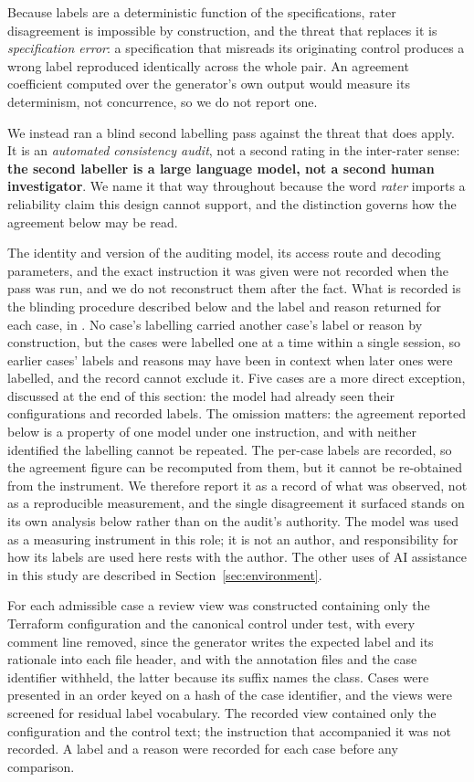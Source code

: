 \documentclass[smallextended]{svjour3}
\begin{document}
Because labels are a deterministic function of the specifications, rater
disagreement is impossible by construction, and the threat that replaces it is
\emph{specification error}: a specification that misreads its originating control
produces a wrong label reproduced identically across the whole pair. An agreement
coefficient computed over the generator's own output would measure its
determinism, not concurrence, so we do not report one.

We instead ran a blind second labelling pass against the threat that does apply.
It is an \emph{automated consistency audit}, not a second rating in the
inter-rater sense: \textbf{the second labeller is a large language model, not a
second human investigator}. We name it that way throughout because the word
\emph{rater} imports a reliability claim this design cannot support, and the
distinction governs how the agreement below may be read.

The identity and version of the auditing model, its access route and decoding
parameters, and the exact instruction it was given were not recorded when the
pass was run, and we do not reconstruct them after the fact. What is recorded is
the blinding procedure described below and the label and reason returned for
each case, in . No case's
labelling carried another case's label or reason by construction, but the cases
were labelled one at a time within a single session, so earlier cases' labels and
reasons may have been in context when later ones were labelled, and the record
cannot exclude it. Five cases are a more direct exception, discussed at the end
of this section: the model had already seen their configurations and recorded
labels. The omission matters: the agreement reported below is a
property of one model under one instruction, and with neither identified the
labelling cannot be repeated. The per-case labels are recorded, so the agreement
figure can be recomputed from them, but it cannot be re-obtained from the
instrument. We therefore report
it as a record of what was observed, not as a reproducible measurement, and the
single disagreement it surfaced stands on its own analysis below rather than on
the audit's authority. The model was used as a measuring
instrument in this role; it is not an author, and responsibility for how its
labels are used here rests with the author. The other uses of AI assistance in
this study are described in Section~\ref{sec:environment}.

For each admissible case a review view was constructed containing only the
Terraform configuration and the canonical control under test, with every comment
line removed, since the generator writes the expected label and its rationale
into each file header, and with the annotation files and the case identifier
withheld, the latter because its suffix names the class. Cases were presented in
an order keyed on a hash of the case identifier, and the views were screened for
residual label vocabulary. The recorded view contained only the configuration and
the control text; the instruction that accompanied it was not recorded. A label
and a reason were recorded for each case before any comparison.
\end{document}
